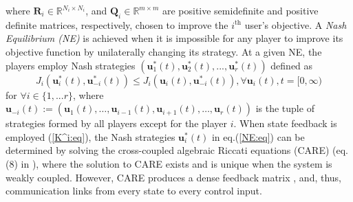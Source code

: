\documentclass[12pt, draftclsnofoot,onecolumn]{IEEEtran}
\begin{document}
\noindent where ${\boldsymbol R}_i {\in} \mathbb{R}^{N_i \times N_i}$, and ${\boldsymbol Q}_i{\in} \mathbb{R}^{m\times m}$ are positive semidefinite and positive definite matrices, respectively, chosen to improve the $i^{\mathrm{th}}$ user's objective. A {\it Nash Equilibrium (NE)} is achieved when it is impossible for any player to improve its objective function by unilaterally changing its strategy. At a given NE, the players employ Nash strategies $({\boldsymbol u}_1^*(t),{\boldsymbol u}_2^*(t),...,{\boldsymbol u}_r^*(t))$ defined as \cite{basar85}
\begin{equation}
J_i(\boldsymbol{u}_i^*(t), \boldsymbol{u}_{-i}^*(t)) {\leq} J_i(\boldsymbol{u}_i(t), \boldsymbol{u}_{-i}^*(t)) ,\forall \boldsymbol u_i(t),t {=} [0,\infty)
\label{NE:eq}
\end{equation}
\noindent for $\forall i{\in} \{1,...r\}$, where $\boldsymbol{u}_{-i}(t){:=} (\boldsymbol{u}_1(t), \hdots, \boldsymbol{u}_{i{-}1}(t),\boldsymbol{u}_{i+1}(t),\allowbreak \hdots, \boldsymbol{u}_{r}(t))$ is the tuple of strategies formed by all players except for the player $i$. When state feedback is employed (\ref{K^i:eq}), the Nash strategies $\boldsymbol{u}_i^*(t)$ in eq.(\ref{NE:eq}) can be determined by solving the cross-coupled algebraic Riccati equations (CARE) (eq.(8) in \cite{Mukaidani2006}), where the solution to CARE exists and is unique when the system is weakly coupled. However, CARE produces a dense feedback matrix \cite{Mukaidani2006}, and, thus, communication links from every state to every control input.
\end{document}
